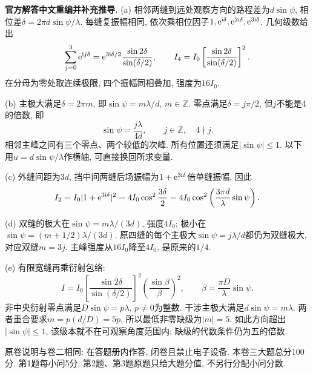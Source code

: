 \begin{solution}
\textbf{官方解答中文重编并补充推导.}
(a) 相邻两缝到远处观察方向的路程差为$d\sin\psi$, 相位差$\delta=2\pi d\sin\psi/\lambda$. 每缝复振幅相同, 依次乘相位因子$1,\mathrm e^{\mathrm i\delta},\mathrm e^{2\mathrm i\delta},\mathrm e^{3\mathrm i\delta}$. 几何级数给出
\[
\sum_{j=0}^3\mathrm e^{\mathrm i j\delta}=
\mathrm e^{3\mathrm i\delta/2}\frac{\sin2\delta}{\sin(\delta/2)},\qquad
I_4=I_0\left[\frac{\sin2\delta}{\sin(\delta/2)}\right]^2.
\]
在分母为零处取连续极限, 四个振幅同相叠加, 强度为$16I_0$.

(b) 主极大满足$\delta=2\pi m$, 即$\sin\psi=m\lambda/d$, $m\in\mathbb Z$. 零点满足$\delta=j\pi/2$, 但$j$不能是4的倍数, 即
\[
\sin\psi=\frac{j\lambda}{4d},\qquad j\in\mathbb Z,\quad4\nmid j.
\]
相邻主峰之间有三个零点、两个较低的次峰. 所有位置还须满足$|\sin\psi|\le1$. 以下用$u=d\sin\psi/\lambda$作横轴, 可直接换回所求变量.

(c) 外缝间距为$3d$, 挡中间两缝后场振幅为$1+\mathrm e^{3\mathrm i\delta}$倍单缝振幅, 因此
\[
I_2=I_0|1+\mathrm e^{3\mathrm i\delta}|^2=4I_0\cos^2\frac{3\delta}{2}
=4I_0\cos^2\left(\frac{3\pi d}{\lambda}\sin\psi\right).
\]
\begin{center}
\end{center}
(d) 双缝的极大在$\sin\psi=m\lambda/(3d)$, 强度$4I_0$; 极小在$\sin\psi=(m+1/2)\lambda/(3d)$. 原四缝的每个主极大$\sin\psi=j\lambda/d$都仍为双缝极大, 对应双缝$m=3j$. 主峰强度从$16I_0$降至$4I_0$, 是原来的$1/4$.

(e) 有限宽缝再乘衍射包络:
\[
I=I_0\left[\frac{\sin2\delta}{\sin(\delta/2)}\right]^2
\left(\frac{\sin\beta}{\beta}\right)^2,\qquad
\beta=\frac{\pi D}{\lambda}\sin\psi.
\]
非中央衍射零点满足$D\sin\psi=p\lambda$, $p\ne0$为整数. 干涉主极大满足$d\sin\psi=m\lambda$. 两者重合要求$m=p(d/D)=5p$, 所以最低非零缺级为$|m|=5$. 如此方向超出$|\sin\psi|\le1$, 该级本就不在可观察角度范围内; 缺级的代数条件仍为五的倍数.
\end{solution}

原卷说明与卷二相同: 在答题册内作答, 闭卷且禁止电子设备. 本卷三大题总分100分. 第1题每小问5分; 第2题、第3题原题只给大题分值, 不另行分配小问分数.


